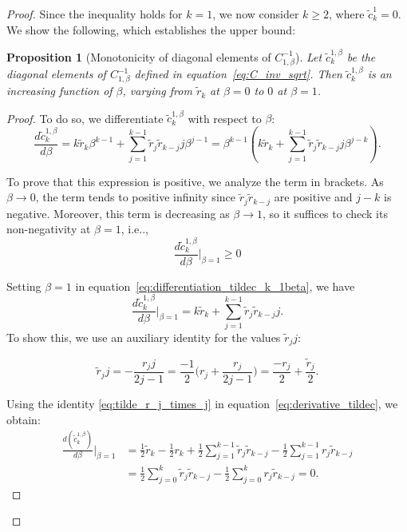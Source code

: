 \documentclass{article} %
\makeatletter
\newtheorem{proposition}{Proposition}
\DeclareRobustCommand\onedot{\futurelet\@let@token\@onedot}
\def\@onedot{\ifx\@let@token.\else.\null\fi\xspace}
\def\ie{{i.e}\onedot} \def\Ie{{I.e}\onedot}
\makeatother
\begin{document}
\begin{proof}
Since the inequality holds for $k = 1$, we now consider $k \geq 2$, where $\tilde{c}^{1}_k = 0$. We show the following, which establishes the upper bound:
\begin{proposition}
[Monotonicity of diagonal elements of $C_{1,\beta}^{-1}$]
\label{prop:tildec}
    Let $\tilde{c}^{1, \beta}_k$ be the diagonal elements of $C_{1,\beta}^{-1}$  defined in equation~\eqref{eq:C_inv_sqrt}. Then $\tilde{c}^{1, \beta}_k$ is an increasing function of $\beta$, varying from $\tilde{r}_k$ at $\beta = 0$ to $0$ at $\beta = 1$.
\end{proposition}
\begin{proof}
To do so, we differentiate $\tilde{c}^{1, \beta}_k$ with respect to $\beta$:
\begin{equation}
\label{eq:differentiation_tildec_k_1beta}
    \frac{d\tilde{c}^{1, \beta}_k}{d\beta} = k\tilde{r}_k \beta^{k - 1} + \sum\limits_{j = 1}^{k-1} \tilde{r}_j \tilde{r}_{k - j} j\beta^{j-1}= \beta^{k-1} \left(k\tilde{r}_k  + \sum\limits_{j = 1}^{k-1} \tilde{r}_j \tilde{r}_{k - j} j\beta^{j-k} \right).
\end{equation}

To prove that this expression is positive, we analyze the term in brackets. As $\beta \to 0$, the term tends to positive infinity since $\tilde{r}_j\tilde{r}_{k - j}$ are positive and $j - k$ is negative. Moreover, this term is decreasing as $\beta \to 1$, so it suffices to check its non-negativity at $\beta = 1$, \ie,
\begin{equation}
\frac{d\tilde{c}^{1, \beta}_k}{d\beta} \bigg|_{\beta = 1} \geq 0
\end{equation}

Setting $\beta=1$ in equation~\eqref{eq:differentiation_tildec_k_1beta}, we have 
\begin{equation}
\label{eq:derivative_tildec}
    \frac{d\tilde{c}^{1, \beta}_k}{d\beta} \bigg|_{\beta = 1} = k\tilde{r}_k  + \sum\limits_{j = 1}^{k-1} \tilde{r}_j \tilde{r}_{k - j} j.
\end{equation}
To show this, we use an auxiliary identity for the values $\tilde{r}_j j$:

\begin{equation}
\label{eq:tilde_r_j_times_j}
    \tilde{r}_j j = -\frac{r_j j}{2j - 1} = \frac{-1}{2} \bigg(r_j + \frac{r_j}{2j - 1} \bigg) = \frac{-r_j}{2} + \frac{\tilde{r}_j}{2}.
\end{equation}

Using the identity \eqref{eq:tilde_r_j_times_j} in equation~\eqref{eq:derivative_tildec}, we obtain:
\begin{equation}
\begin{aligned}
    \frac{d(\tilde{c}^{1, \beta}_k)}{d\beta} \bigg|_{\beta = 1} &= \frac{1}{2} \tilde{r}_k - \frac{1}{2} r_k  + \frac{1}{2} \sum\limits_{j = 1}^{k-1} \tilde{r}_j \tilde{r}_{k - j} - \frac{1}{2} \sum\limits_{j = 1}^{k-1} r_j \tilde{r}_{k - j} \\
    &= \frac{1}{2} \sum\limits_{j = 0}^{k} \tilde{r}_j \tilde{r}_{k - j} - \frac{1}{2} \sum\limits_{j = 0}^{k} r_j \tilde{r}_{k - j} = 0.
\end{aligned}
\end{equation}


\end{proof}
\end{proof}
\end{document}
